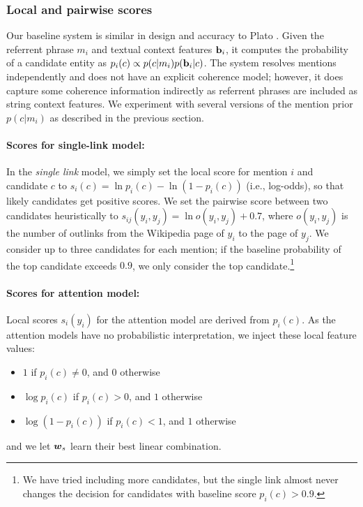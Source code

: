 \subsubsection{Local and pairwise scores}
\label{sec:expt:features}

Our baseline system is similar in design and accuracy to Plato \cite{Lazic2015}.
Given the referrent phrase $m_i$ and textual context features ${\bf b}_i$, it computes
the probability of a candidate entity as $p_i(c) \propto p(c|m_i)p({\bf b}_i|c)$. 
The system resolves mentions independently and does not have an explicit coherence model;
however, it does capture some coherence information indirectly as referrent phrases are
included as string context features. We experiment with several versions of the
mention prior $p(c|m_i)$ as described in the previous section. 


\paragraph*{Scores for single-link model:}
In the \emph{single link} model, we simply set the local score for
mention $i$ and candidate $c$ to $s_i(c) = \ln p_i(c) - \ln (1 -
p_i(c))$ (i.e., log-odds), so that likely candidates get positive
scores.  We set the pairwise score between two candidates heuristically to
$s_{ij}(y_i, y_j) = \ln o(y_i, y_j) + 0.7$, where $o(y_i, y_j)$ is the number of
outlinks from the Wikipedia page of $y_i$ to the page of $y_j$.  We
consider up to three candidates for each mention; if the baseline
probability of the top candidate exceeds $0.9$, we only consider the top
candidate.\footnote{We have tried including more candidates, but the single link
almost never changes the decision for candidates with baseline score $p_i(c)>0.9$.}

\paragraph*{Scores for attention model:}
Local scores $s_i(y_i)$ for the attention model are derived from
$p_i(c)$.  As the attention models have no probabilistic
interpretation, we inject these local feature values:
\begin{itemize}
\item $1$ if $p_i(c)\ne 0$, and 0 otherwise
\item $\log p_i(c)$ if $p_i(c)>0$, and $1$ otherwise
\item $\log(1-p_i(c))$ if $p_i(c)<1$, and $1$ otherwise
\end{itemize}
and we let $\boldsymbol{w}_s$ learn their best linear combination.  

